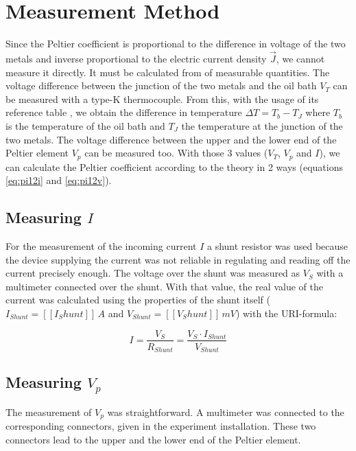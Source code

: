 \documentclass[a4paper]{article}
\begin{document}
\section{Measurement Method}

Since the Peltier coefficient is proportional to the difference in voltage of the two metals and inverse proportional to the electric current density $\vec{J}$, we cannot measure it directly. It must be calculated from of measurable quantities.
\newline
The voltage difference between the junction of the two metals and the oil bath $V_T$ can be measured with a type-K thermocouple. From this, with the usage of its reference table \cite{thermocouple}, we obtain the difference in temperature $\Delta T = T_{b} - T_J$ where $T_b$ is the temperature of the oil bath and $T_J$ the temperature at the junction of the two metals.
\newline
The voltage difference between the upper and the lower end of the Peltier element $V_p$ can be measured too.
\newline
With those 3 values ($V_T$, $V_p$ and $I$), we can calculate the Peltier coefficient according to the theory in 2 ways (equations \eqref{eq:pi12i} and \eqref{eq:pi12v}).

\subsection{Measuring $I$}

For the measurement of the incoming current $I$ a shunt resistor was used because the device supplying the current was not reliable in regulating and reading off the current precisely enough. The voltage over the shunt was measured as $V_S$ with a multimeter connected over the shunt. With that value, the real value of the current was calculated using the properties of the shunt itself ($I_{Shunt} = [[I_Shunt]]\, A$ and $V_{Shunt} = [[V_Shunt]]\, mV$) with the URI-formula:

\begin{equation}
I = \frac{V_S}{R_{Shunt}} = \frac{V_S \cdot I_{Shunt}}{V_{Shunt}}
\label{eq:current}
\end{equation}

\subsection{Measuring $V_p$}

The measurement of $V_p$ was straightforward. A multimeter was connected to the corresponding connectors, given in the experiment installation. These two connectors lead to the upper and the lower end of the Peltier element.
\end{document}
